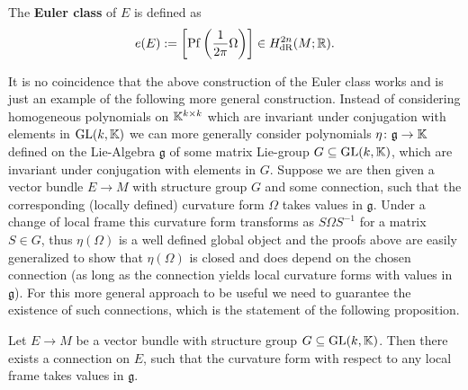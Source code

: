\begin{definition}
    The \textbf{Euler class} of $E$ is defined as 
    \[
    e(E) := \left[\mathrm{Pf}\left(\frac{1}{2\pi}\Omega\right)\right] \in H_\mathrm{dR}^{2n}(M;\mathbb{R}).
    \]
\end{definition}

It is no coincidence that the above construction of the Euler class works and is just an example of the following more general construction. Instead of considering homogeneous polynomials on $\mathbb{K}^{k \times k}$ which are invariant under conjugation with elements in $\mathrm{GL}(k,\mathbb{K})$ we can more generally consider polynomials $\eta \colon\mathfrak{g} \to \mathbb{K}$ defined on the Lie-Algebra $\mathfrak{g}$ of some matrix Lie-group $G \subseteq \mathrm{GL}(k,\mathbb{K})$, which are invariant under conjugation with elements in $G$. Suppose we are then given a vector bundle $E \to M$ with structure group $G$ and some connection, such that the corresponding (locally defined) curvature form $\Omega$ takes values in $\mathfrak{g}$. Under a change of local frame this curvature form transforms as $S \Omega S^{-1}$ for a matrix $S \in G$, thus $\eta(\Omega)$ is a well defined global object and the proofs above are easily generalized to show that $\eta(\Omega)$ is closed and does depend on the chosen connection (as long as the connection yields local curvature forms with values in $\mathfrak{g}$). For this more general approach to be useful we need to guarantee the existence of such connections, which is the statement of the following proposition.

\begin{proposition}
    Let $E \to M$ be a vector bundle with structure group $G \subseteq \mathrm{GL}(k,\mathbb{K})$. Then there exists a connection on $E$, such that the curvature form with respect to any local frame \footnotemark takes values in $\mathfrak{g}$. 
\end{proposition}

